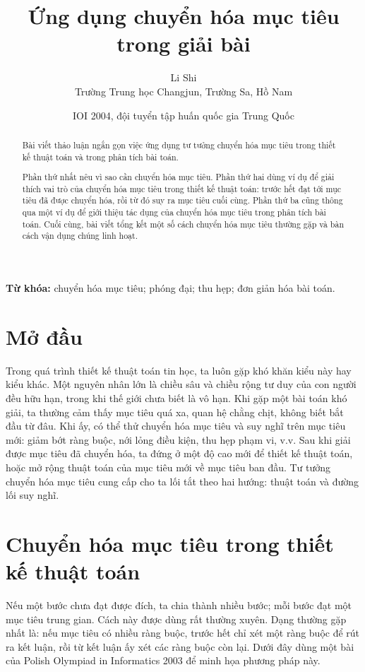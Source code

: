 \documentclass[11pt]{article}
\title{Ứng dụng chuyển hóa mục tiêu trong giải bài}
\author{Li Shi\\Trường Trung học Changjun, Trường Sa, Hồ Nam}
\date{IOI 2004, đội tuyển tập huấn quốc gia Trung Quốc}
\begin{document}
\maketitle


\begin{abstract}
Bài viết thảo luận ngắn gọn việc ứng dụng tư tưởng chuyển hóa mục tiêu trong
thiết kế thuật toán và trong phân tích bài toán.

Phần thứ nhất nêu vì sao cần chuyển hóa mục tiêu. Phần thứ hai dùng ví dụ để
giải thích vai trò của chuyển hóa mục tiêu trong thiết kế thuật toán: trước
hết đạt tới mục tiêu đã được chuyển hóa, rồi từ đó suy ra mục tiêu cuối cùng.
Phần thứ ba cũng thông qua một ví dụ để giới thiệu tác dụng của chuyển hóa mục
tiêu trong phân tích bài toán. Cuối cùng, bài viết tổng kết một số cách
chuyển hóa mục tiêu thường gặp và bàn cách vận dụng chúng linh hoạt.
\end{abstract}

\noindent\textbf{Từ khóa:} chuyển hóa mục tiêu; phóng đại; thu hẹp; đơn giản
hóa bài toán.

\section{Mở đầu}

Trong quá trình thiết kế thuật toán tin học, ta luôn gặp khó khăn kiểu này hay
kiểu khác. Một nguyên nhân lớn là chiều sâu và chiều rộng tư duy của con
người đều hữu hạn, trong khi thế giới chưa biết là vô hạn. Khi gặp một bài
toán khó giải, ta thường cảm thấy mục tiêu quá xa, quan hệ chằng chịt, không
biết bắt đầu từ đâu. Khi ấy, có thể thử chuyển hóa mục tiêu và suy nghĩ trên
mục tiêu mới: giảm bớt ràng buộc, nới lỏng điều kiện, thu hẹp phạm vi, v.v.
Sau khi giải được mục tiêu đã chuyển hóa, ta đứng ở một độ cao mới để thiết
kế thuật toán, hoặc mở rộng thuật toán của mục tiêu mới về mục tiêu ban đầu.
Tư tưởng chuyển hóa mục tiêu cung cấp cho ta lối tắt theo hai hướng: thuật
toán và đường lối suy nghĩ.

\section{Chuyển hóa mục tiêu trong thiết kế thuật toán}

Nếu một bước chưa đạt được đích, ta chia thành nhiều bước; mỗi bước đạt một
mục tiêu trung gian. Cách này được dùng rất thường xuyên. Dạng thường gặp nhất
là: nếu mục tiêu có nhiều ràng buộc, trước hết chỉ xét một ràng buộc để rút ra
kết luận, rồi từ kết luận ấy xét các ràng buộc còn lại. Dưới đây dùng một bài
của Polish Olympiad in Informatics 2003 để minh họa phương pháp này.
\end{document}
